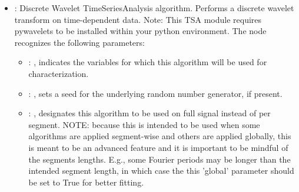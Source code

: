 \begin{itemize}
    \item {}:
      Discrete Wavelet TimeSeriesAnalysis algorithm. Performs a discrete wavelet transform
      on time-dependent data. Note: This TSA module requires pywavelets to be installed within your
      python environment.
      The  node recognizes the following parameters:
        \begin{itemize}
          \item {}: ,
            indicates the variables for which this algorithm will be used for characterization.
          \item {}: ,
            sets a seed for the underlying random number generator, if present.
          \item {}: ,
            designates this algorithm to be used on full signal instead of per
            segment. NOTE: because this is intended to be used when some algorithms are
            applied segment-wise and others are applied globally, this is meant to be an
            advanced feature and it is important to be mindful of the segments lengths.
            E.g., some Fourier periods may be longer than the intended segment length, in
            which case the this 'global' parameter should be set to True for better
            fitting. 
      \end{itemize}


\end{itemize}
